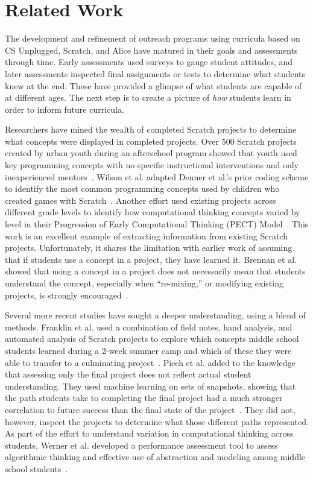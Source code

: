 \section{Related Work}
The development and refinement of outreach programs using curricula based on CS
Unplugged, Scratch, and Alice have matured in their goals and assessments
through time. Early assessments used surveys to gauge student attitudes, and
later assessments inspected final assignments or tests to determine what
students knew at the end. These have provided a glimpse of what students are
capable of at different ages. The next step is to create a picture of
\emph{how} students learn in order to inform future curricula.

Researchers have mined the wealth of completed Scratch projects to determine
what concepts were displayed in completed projects. Over 500 Scratch projects
created by urban youth during an afterschool program showed that youth used key
programming concepts with no specific instructional interventions and only
inexperienced mentors~\cite{Maloney:2008:PCU:1352135.1352260}. Wilson et
al. adapted Denner et al.'s prior coding scheme to identify the most common
programming concepts used by children who created games with
Scratch~\cite{Denner:2012:CGC:2072695.2073050, wilson12}. Another effort used
existing projects across different grade levels to identify how computational
thinking concepts varied by level in their Progression of Early Computational
Thinking (PECT) Model~\cite{Seiter:2013:MLP:2493394.2493403}. This work is an
excellent example of extracting information from existing Scratch
projects. Unfortunately, it shares the limitation with earlier work of assuming
that if students use a concept in a project, they have learned it. Brennan et
al. showed that using a concept in a project does not necessarily mean that
students understand the concept, especially when ``re-mixing,'' or modifying
existing projects, is strongly encouraged~\cite{brennan12}.

Several more recent studies have sought a deeper understanding, using a blend
of methods. Franklin et al. used a combination of field notes, hand analysis,
and automated analysis of Scratch projects to explore which concepts middle
school students learned during a 2-week summer camp and which of these they
were able to transfer to a culminating
project~\cite{Boe:2013:HLS:2445196.2445265, Franklin:2013:SBO}. Piech et
al. added to the knowledge that assessing only the final project does not
reflect actual student understanding. They used machine learning on sets of
snapshots, showing that the path students take to completing the final project
had a much stronger correlation to future success than the final state of the
project~\cite{Piech:2012:MSL:2157136.2157182}. They did not, however, inspect
the projects to determine what those different paths represented. As part of
the effort to understand variation in computational thinking across students,
Werner et al. developed a performance assessment tool to assess algorithmic
thinking and effective use of abstraction and modeling among middle school
students~\cite{Werner:2012:FPA:2157136.2157200}.

